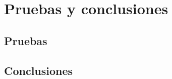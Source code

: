 \chapter{Pruebas y conclusiones}\label{pruebas}

\section{Pruebas}

	
\section{Conclusiones}\label{conclusiones} 

